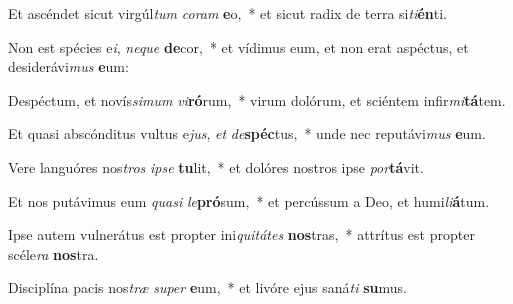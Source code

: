 \item Et ascéndet sicut virgúl\textit{tum} \textit{co}\textit{ram} \textbf{e}o,~* et sicut radix de terra si\textit{ti}\textbf{én}ti.
\item Non est spécies e\textit{i}, \textit{ne}\textit{que} \textbf{de}cor,~* et vídimus eum, et non erat aspéctus, et desiderávi\textit{mus} \textbf{e}um:
\item Despéctum, et novís\textit{si}\textit{mum} \textit{vi}\textbf{ró}rum,~* virum dolórum, et sciéntem infir\textit{mi}\textbf{tá}tem.
\item Et quasi abscónditus vultus e\textit{jus}, \textit{et} \textit{de}\textbf{spéc}tus,~* unde nec reputávi\textit{mus} \textbf{e}um.
\item Vere languóres nos\textit{tros} \textit{ip}\textit{se} \textbf{tu}lit,~* et dolóres nostros ipse \textit{por}\textbf{tá}vit.
\item Et nos putávimus eum \textit{qua}\textit{si} \textit{le}\textbf{pró}sum,~* et percússum a Deo, et humi\textit{li}\textbf{á}tum.
\item Ipse autem vulnerátus est propter ini\textit{qui}\textit{tá}\textit{tes} \textbf{nos}tras,~* attrítus est propter scéle\textit{ra} \textbf{nos}tra.
\item Disciplína pacis nos\textit{træ} \textit{su}\textit{per} \textbf{e}um,~* et livóre ejus saná\textit{ti} \textbf{su}mus.
